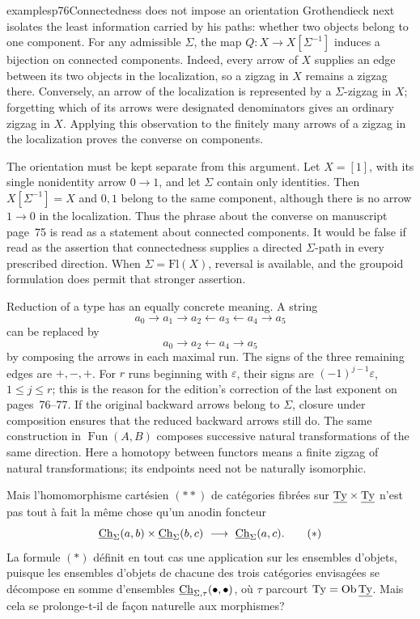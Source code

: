 \begin{dcomment}{examples}{p76}{Connectedness does not impose an orientation}
Grothendieck next isolates the least information carried by his paths: whether two objects belong to one component. For any admissible $\Sigma$, the map $Q:X\to X[\Sigma^{-1}]$ induces a bijection on connected components. Indeed, every arrow of $X$ supplies an edge between its two objects in the localization, so a zigzag in $X$ remains a zigzag there. Conversely, an arrow of the localization is represented by a $\Sigma$-zigzag in $X$; forgetting which of its arrows were designated denominators gives an ordinary zigzag in $X$. Applying this observation to the finitely many arrows of a zigzag in the localization proves the converse on components.

The orientation must be kept separate from this argument. Let $X=[1]$, with its single nonidentity arrow $0\to1$, and let $\Sigma$ contain only identities. Then $X[\Sigma^{-1}]=X$ and $0,1$ belong to the same component, although there is no arrow $1\to0$ in the localization. Thus the phrase about the converse on manuscript page~75 is read as a statement about connected components. It would be false if read as the assertion that connectedness supplies a directed $\Sigma$-path in every prescribed direction. When $\Sigma=\mathrm{Fl}(X)$, reversal is available, and the groupoid formulation does permit that stronger assertion.

Reduction of a type has an equally concrete meaning. A string
\[
 a_0\longrightarrow a_1\longrightarrow a_2
 \longleftarrow a_3\longleftarrow a_4\longrightarrow a_5
\]
can be replaced by
\[
 a_0\longrightarrow a_2\longleftarrow a_4\longrightarrow a_5
\]
by composing the arrows in each maximal run. The signs of the three remaining edges are $+,-,+$. For $r$ runs beginning with $\varepsilon$, their signs are $(-1)^{j-1}\varepsilon$, $1\leq j\leq r$; this is the reason for the edition's correction of the last exponent on pages~76--77. If the original backward arrows belong to $\Sigma$, closure under composition ensures that the reduced backward arrows still do. The same construction in $\operatorname{Fun}(A,B)$ composes successive natural transformations of the same direction. Here a homotopy between functors means a finite zigzag of natural transformations; its endpoints need not be naturally isomorphic.
\end{dcomment}


Mais l'homomorphisme cartésien $(**)$ de catégories fibrées sur $\underline{\mathrm{Ty}}\times\underline{\mathrm{Ty}}$ n'est pas tout à fait la même chose qu'un anodin foncteur
\[
\Ch_{\Sigma}(a,b)\times\Ch_{\Sigma}(b,c) \ \longrightarrow\ \Ch_{\Sigma}(a,c). \tag*{$(*)$}
\]
La formule $(*)$ définit en tout cas une application sur les ensembles d'objets, puisque les ensembles d'objets de chacune des trois catégories envisagées se décompose en somme d'ensembles $\underline{\mathrm{Ch}}_{\Sigma,\tau}(\bullet,\bullet)$, où $\tau$ parcourt $\mathrm{Ty} = \operatorname{Ob}\underline{\mathrm{Ty}}$. Mais cela se prolonge-t-il de façon naturelle aux morphismes?

